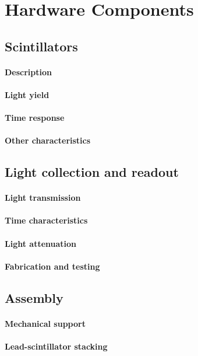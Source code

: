 \section{Hardware Components}

\subsection{Scintillators}
\paragraph{Description}
\paragraph{Light yield}
\paragraph{Time response}
\paragraph{Other characteristics}

\subsection{Light collection and readout}
\paragraph{Light transmission}
\paragraph{Time characteristics}
\paragraph{Light attenuation}
\paragraph{Fabrication and testing}

\subsection{Assembly}
\paragraph{Mechanical support}
\paragraph{Lead-scintillator stacking}

